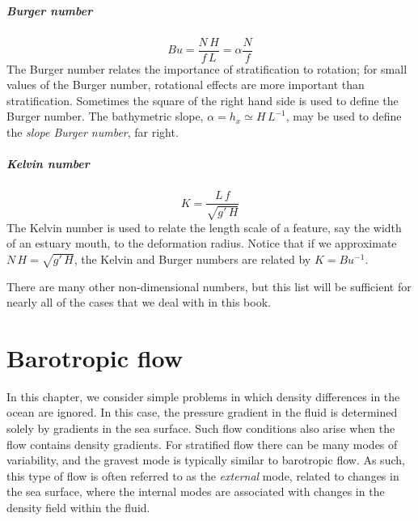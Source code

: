 \documentclass[11pt]{report}
\numberwithin{equation}{section}
\begin{document}
\paragraph{Burger number} 
\begin{equation}
    Bu = \frac{N\,H}{f\,L} = \alpha\frac{N}{f}
\end{equation}
The Burger number relates the importance of stratification to rotation; for small values of the Burger number, rotational effects are more important than stratification.  Sometimes the square of the right hand side is used to define the Burger number.  The bathymetric slope, $\alpha = h_x \simeq H\,L^{-1}$, may be used to define the {\it slope Burger number}, far right.

\paragraph{Kelvin number} 
\begin{equation}
    K = \frac{L\,f}{\sqrt{g'\,H}}
\end{equation}
The Kelvin number is used to relate the length scale of a feature, say the width of an estuary mouth, to the deformation radius.  Notice that if we approximate $N\,H = \sqrt{g'\,H}$, the Kelvin and Burger numbers are related by $K=Bu^{-1}$.

There are many other non-dimensional numbers, but this list will be sufficient for nearly all of the cases that we deal with in this book.



\chapter{Barotropic flow}

In this chapter, we consider simple problems in which density differences in the ocean are ignored.  In this case, the pressure gradient in the fluid is determined solely by gradients in the sea surface.  Such flow conditions also arise when the flow contains density gradients.  For stratified flow there can be many modes of variability, and the gravest mode is typically similar to barotropic flow.  As such, this type of flow is often referred to as the {\it external} mode, related to changes in the sea surface, where the {internal} modes are associated with changes in the density field within the fluid.
\end{document}
